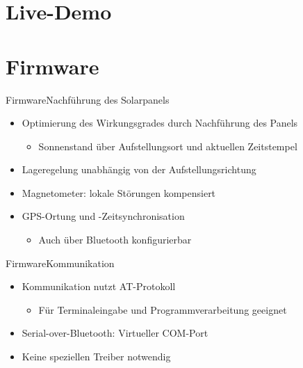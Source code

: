 \documentclass{beamer}
\begin{document}
\section{Live-Demo}

\section{Firmware}

\begin{frame}{Firmware}{Nachführung des Solarpanels}
    \begin{itemize}[<+->]
        \item Optimierung des Wirkungsgrades durch Nachführung des Panels
        \begin{itemize}
            \item Sonnenstand über Aufstellungsort und aktuellen Zeitstempel
        \end{itemize}
        \item Lageregelung unabhängig von der Aufstellungsrichtung
        \item Magnetometer: lokale Störungen kompensiert
        \item GPS-Ortung und -Zeitsynchronisation
        \begin{itemize}
            \item Auch über Bluetooth konfigurierbar
        \end{itemize}
    \end{itemize}
\end{frame}

\begin{frame}{Firmware}{Kommunikation}
    \begin{itemize}[<+->]
        \item Kommunikation nutzt AT-Protokoll
        \begin{itemize}
            \item Für Terminaleingabe und Programmverarbeitung geeignet
        \end{itemize}
        \item Serial-over-Bluetooth: Virtueller COM-Port
        \item Keine speziellen Treiber notwendig
    \end{itemize}    
\end{frame}
\end{document}
